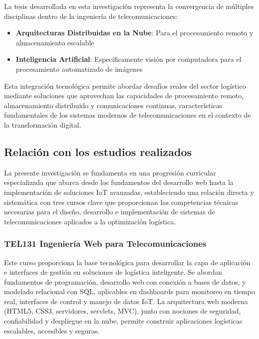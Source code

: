 La tesis desarrollada en esta investigación representa la convergencia de múltiples disciplinas dentro de la ingeniería de telecomunicaciones:

\begin{itemize}
    \item \textbf{Arquitecturas Distribuidas en la Nube}: Para el procesamiento remoto y almacenamiento escalable
    \item \textbf{Inteligencia Artificial}: Específicamente visión por computadora para el procesamiento automatizado de imágenes
\end{itemize}

Esta integración tecnológica permite abordar desafíos reales del sector logístico mediante soluciones que aprovechan las capacidades de procesamiento remoto, almacenamiento distribuido y comunicaciones continuas, características fundamentales de los sistemas modernos de telecomunicaciones en el contexto de la transformación digital.

\subsection{Relación con los estudios realizados}

La presente investigación se fundamenta en una progresión curricular especializada que abarca
desde los fundamentos del desarrollo web hasta la implementación de soluciones IoT
avanzadas, estableciendo una relación directa y sistemática con tres cursos clave que
proporcionan las competencias técnicas necesarias para el diseño, desarrollo e implementación
de sistemas de telecomunicaciones aplicados a la optimización logística.

\subsubsection{TEL131 Ingeniería Web para Telecomunicaciones}

Este curso proporciona la base tecnológica para desarrollar la capa de aplicación e interfaces de
gestión en soluciones de logística inteligente. Se abordan fundamentos de programación,
desarrollo web con conexión a bases de datos, y modelado relacional con SQL, aplicables en
dashboards para monitoreo en tiempo real, interfaces de control y manejo de datos IoT. La
arquitectura web moderna (HTML5, CSS3, servidores, servlets, MVC), junto con nociones de
seguridad, confiabilidad y despliegue en la nube, permite construir aplicaciones logísticas
escalables, accesibles y seguras.

